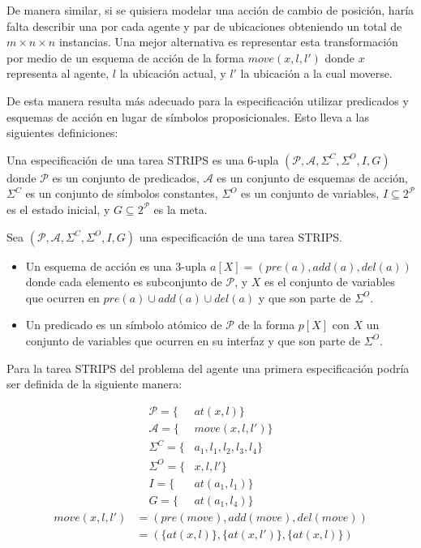 De manera similar, si se quisiera modelar una acción de cambio de posición,
haría falta describir una por cada agente y par de ubicaciones obteniendo un
total de $m \times n \times n$ instancias. Una mejor alternativa es representar
esta transformación por medio de un esquema de acción de la forma $move(x, l,
l')$ donde $x$ representa al agente, $l$ la ubicación actual, y $l'$ la ubicación
a la cual moverse.

De esta manera resulta más adecuado para la especificación utilizar predicados y
esquemas de acción en lugar de símbolos proposicionales. Esto lleva a las
siguientes definiciones:

\begin{mydef}
    Una especificación de una tarea STRIPS es una 6-upla $(\mathcal{P},
    \mathcal{A}, \Sigma^{C}, \Sigma^{O}, I, G)$  donde $\mathcal{P}$ es un
    conjunto de predicados, $\mathcal{A}$ es un conjunto de esquemas de acción,
    $\Sigma^{C}$ es un conjunto de símbolos constantes, $\Sigma^{O}$ es un conjunto de 
    variables, $I \subseteq 2^{\mathcal{P}}$ es el estado inicial, y $G \subseteq 2^{\mathcal{P}}$
    es la meta.
\end{mydef}

\begin{mydef}
    Sea $(\mathcal{P}, \mathcal{A}, \Sigma^{C}, \Sigma^{O}, I, G)$ una
    especificación de una tarea STRIPS.

    \begin{itemize}
        \item Un esquema de acción es una 3-upla $a[X] = (pre(a), add(a),
        del(a))$ donde cada elemento es subconjunto de $\mathcal{P}$, y $X$ es el
        conjunto de variables que ocurren en $pre(a) \cup add(a) \cup del(a)$ y
        que son parte de $\Sigma^{O}$.
        \item Un predicado es un símbolo atómico de $\mathcal{P}$ de la forma
        $p[X]$ con $X$ un conjunto de variables que ocurren en su interfaz y
        que son parte de $\Sigma^{O}$.
    \end{itemize}
\end{mydef}

Para la tarea STRIPS del problema del agente una primera especificación podría ser definida de la siguiente manera:

\begin{align*}
    \mathcal{P} = \{&at(x, l)\} \\
    \mathcal{A} = \{&move(x, l, l')\} \\
    \Sigma^{C} = \{&a_1, l_1, l_2, l_3, l_4\} \\
    \Sigma^{O} = \{&x, l, l'\} \\
    I = \{&at(a_1, l_1)\} \\
    G = \{&at(a_1, l_4)\}
\end{align*}
\begin{align*}
    move(x, l, l') &= (pre(move), add(move), del(move)) \\
                   &= (\{at(x, l)\}, \{at(x, l')\},\{at(x, l)\})
\end{align*}

